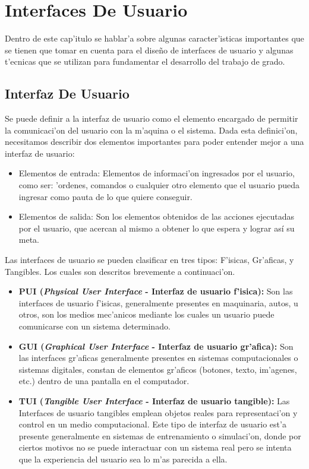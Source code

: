 \chapter{Interfaces De Usuario}
\label{capitulotres}

Dentro de este cap'itulo se hablar'a sobre algunas caracter'isticas importantes que se tienen que tomar en cuenta para el dise\~no de interfaces de usuario y algunas t'ecnicas que se utilizan para fundamentar el desarrollo del trabajo de grado.

\section{Interfaz De Usuario}
Se puede definir a la interfaz de usuario como el elemento encargado de permitir la comunicaci'on del usuario con la m'aquina o el sistema. Dada esta definici'on, necesitamos describir dos elementos importantes para poder entender mejor a una interfaz de usuario:

\begin{itemize}
	\item Elementos de entrada: Elementos  de informaci'on ingresados por el usuario, como ser: 'ordenes, comandos o cualquier otro elemento que el usuario pueda ingresar como pauta de lo que quiere conseguir.

	\item Elementos de salida: Son los elementos obtenidos de las acciones ejecutadas por el usuario, que acercan al mismo a obtener lo que espera y lograr así su meta.
\end{itemize}

\medskip
Las interfaces de usuario se pueden clasificar en tres tipos: F'isicas, Gr'aficas, y Tangibles. Los cuales son descritos brevemente a continuaci'on.

\begin{itemize}
	\item \textbf{PUI (\textit{Physical User Interface} - Interfaz de usuario f'isica):} Son las interfaces de usuario f'isicas, generalmente presentes en maquinaria, autos, u otros, son los medios mec'anicos mediante los cuales un usuario puede comunicarse con un sistema determinado.
 
	\item \textbf{ GUI (\textit{Graphical User Interface} - Interfaz de usuario gr'afica):} Son las interfaces gr'aficas generalmente presentes en sistemas computacionales o sistemas digitales, constan de elementos gr'aficos (botones, texto, im'agenes, etc.) dentro de una pantalla en el computador.

	\item \textbf{TUI (\textit{Tangible User Interface} - Interfaz de usuario tangible):} Las Interfaces de usuario tangibles emplean objetos reales para representaci'on y control en un medio computacional. Este tipo de interfaz de usuario est'a presente generalmente en sistemas de entrenamiento o simulaci'on, donde por ciertos motivos no se puede interactuar con un sistema real pero se intenta que la experiencia del usuario sea lo m'as parecida a ella.
\end{itemize}

